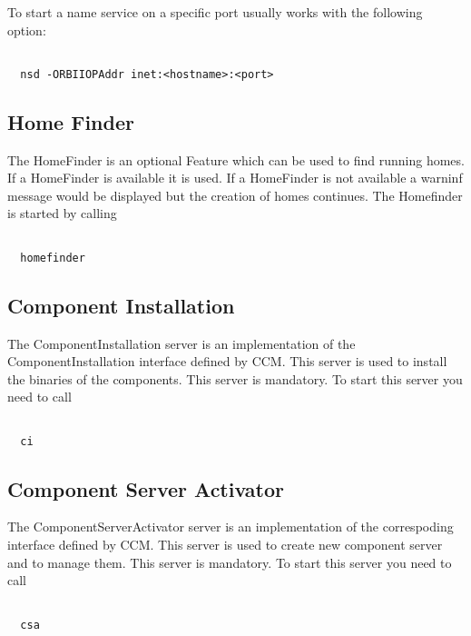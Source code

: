 \documentclass[12pt,a4paper]{report}
\begin{document}
To start a name service on a specific port usually works with the following option:

\small
\begin{verbatim}

  nsd -ORBIIOPAddr inet:<hostname>:<port>

\end{verbatim}
\normalsize

\subsection{Home Finder}
\label{sec:HomeFinder}

The HomeFinder is an optional Feature which can be used to find running homes. If a HomeFinder is available it is used. If a HomeFinder is not available a warninf message would be displayed but the creation of homes continues. The Homefinder is started by calling

\small
\begin{verbatim}

  homefinder

\end{verbatim}
\normalsize

\subsection{Component Installation}
\label{sec:ComponentInstallation}
The ComponentInstallation server is an implementation of the ComponentInstallation interface defined by CCM. This server is used to install the binaries of the components. This server is mandatory. To start this server you need to call

\small
\begin{verbatim}

  ci

\end{verbatim}
\normalsize

\subsection{Component Server Activator}
\label{sec:ComponentServerActivator}

The ComponentServerActivator server is an implementation of the correspoding interface defined by CCM. This server is used to create new component server and to manage them. This server is mandatory. To start this server you need to call 

\small
\begin{verbatim}

  csa

\end{verbatim}
\normalsize
\end{document}
